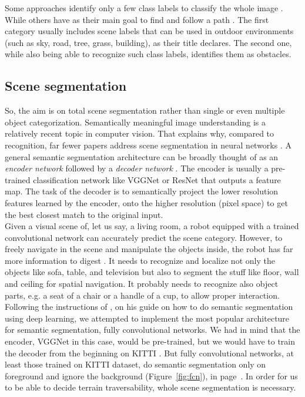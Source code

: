 \documentclass[12pt,a4paper,table,dvipsnames,tikz]{report}
\newcommand{\term}{\textit}
\newcommand{\acronym}{\MakeUppercase}
\newcommand{\bl}[1]{{\hypersetup{linkcolor=blue}#1}}
\begin{document}
	Some approaches identify only a few class labels to classify the whole image 
	\citep{Holder, Bosch, Farabet}. While others have as their main goal to find and follow 
	a path \citep{Yang, Orsic}. The first category usually includes scene labels that can 
	be used in outdoor environments (such as sky, road, tree, grass, building), as their 
	title declares. The second one, while also being able to recognize such class labels, 
	identifies them as obstacles.
	\\
	
	
	\subsection{Scene segmentation}
	\label{sec:fg:nn:segm}
	
	So, the aim is on total scene segmentation rather than single or even multiple object 
	categorization. Semantically meaningful image understanding is a relatively recent topic 
	in computer vision. That explains why, compared to recognition, far fewer papers address 
	scene segmentation in neural networks \cite{Wang}. A general semantic segmentation 
	architecture can be broadly thought of as an \term{encoder network} followed by a 
	\term{decoder network} \citep{Le}. The encoder is usually a pre-trained classification 
	network like VGGNet or ResNet that outputs a feature map. The task of the decoder is 
	to semantically project the lower resolution features learned by the encoder, onto the 
	higher resolution (pixel space) to get the best closest match to the original input.
	\\
	
	Given a visual scene of, let us say, a living room, a robot equipped with 
	a trained convolutional network can accurately predict the scene category. However, to 
	freely navigate in the scene and manipulate the objects inside, the robot has far more 
	information to digest \citep{Zhou_sem}. It needs to recognize and localize not only the 
	objects like sofa, table, and television but also to segment the stuff like floor, 
	wall and ceiling for spatial navigation. It probably needs to recognize also object parts, 
	e.g. a seat of a chair or a handle of a cup, to allow proper interaction.
	\\
	
	Following the instructions of \citet{Le}, on his guide on how to do semantic segmentation 
	using deep learning, we attempted to implement the most popular 
	architecture for semantic segmentation, fully convolutional networks. We had in mind 
	that the encoder, VGGNet in this case, would be pre-trained, but we would have to 
	train the decoder from the beginning on \acronym{kitti} \citep{kitti}. But fully 
	convolutional networks, at least those trained on \acronym{kitti} dataset, do semantic 
	segmentation only on foreground and ignore the background (Figure~\bl{\ref{fig:fcn}}), 
	in page~\bl{\pageref{fig:fcn}}. In 
	order for us to be able to decide terrain traversability, whole scene segmentation is 
	necessary.
	\\
	
\end{document}

